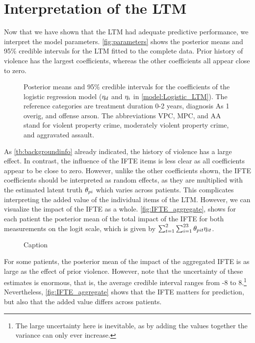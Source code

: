 \documentclass[a4paper,11pt]{article}
\begin{document}
\section{Interpretation of the LTM}
Now that we have shown that the LTM had adequate predictive performance, we interpret the model parameters.
\autoref{fig:parameters} shows the posterior means and 95\% credible intervals for the LTM fitted to the complete data.
Prior history of violence has the largest coefficients, whereas the other coefficients all appear close to zero.
\begin{figure}[!ht]
    \centering
    
    \caption{Posterior means and 95\% credible intervals for the coefficients of the logistic regression model ($\eta_{d}$ and $\eta_{i}$ in \autoref{model:Logistic_LTM}). The reference categories are treatment duration 0-2 years, diagnosis As 1 overig, and offense arson. The abbreviations VPC, MPC, and AA stand for violent property crime, moderately violent property crime, and aggravated assault.}
    \label{fig:parameters}
\end{figure}
As \autoref{tb:backgroundinfo} already indicated, the history of violence has a large effect.
In contrast, the influence of the IFTE items is less clear as all coefficients appear to be close to zero.
However, unlike the other coefficients shown, the IFTE coefficients should be interpreted as random effects, as they are multiplied with the estimated latent truth $\theta_{pi}$ which varies across patients.
This complicates interpreting the added value of the individual items of the LTM.
However, we can visualize the impact of the IFTE as a whole. %
\autoref{fig:IFTE_aggregate}, shows for each patient the posterior mean of the total impact of the IFTE for both measurements on the logit scale, which is given by $\sum_{t=1}^2\sum_{i=1}^{23}\theta_{pit}\eta_{it}$.
\begin{figure}[!ht]
    \centering
    
    \caption{Caption}
    \label{fig:IFTE_aggregate}
\end{figure}
For some patients, the posterior mean of the impact of the aggregated IFTE is as large as the effect of prior violence.
However, note that the uncertainty of these estimates is enormous, that is, the average credible interval ranges from -8 to 8.\footnote{The large uncertainty here is inevitable, as by adding the values together the variance can only ever increase.}
Nevertheless, \autoref{fig:IFTE_aggregate} shows that the IFTE matters for prediction, but also that the added value differs across patients.
\end{document}
